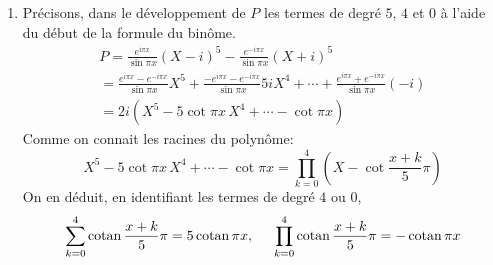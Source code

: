 \begin{enumerate}
\item  Pr\'{e}cisons, dans le d\'{e}veloppement de $P$ les termes de degré $5$, $4$ et $0$ \`{a} l'aide du d\'{e}but de la formule du bin\^{o}me. 
\begin{multline*}
P =\frac{e^{i\pi x}}{\sin \pi x}(X-i)^{5}-\frac{e^{-i\pi x}}{\sin \pi x}(X+i)^{5} \\
  = \frac{e^{i\pi x}-e^{-i\pi x}}{\sin \pi x}X^{5}+\frac{-e^{i\pi x}-e^{-i\pi x}}{\sin \pi x}5iX^{4}+\cdots
 +\frac{e^{i\pi x}+e^{-i\pi x}}{\sin \pi x}(-i)\\
  = 2i\left( X^{5}-5\cot \pi x\,X^{4}+\cdots -\cot \pi x\right)
\end{multline*}
Comme on connait les racines du polynôme:
\begin{displaymath}
X^{5}-5\cot \pi x\,X^{4}+\cdots -\cot \pi x = \prod_{k=0}^{4}\left( X-\cot \frac{x+k}{5}\pi \right)  
\end{displaymath}
On en d\'{e}duit, en identifiant les termes de degré $4$ ou $0$,
\begin{displaymath}
\sum_{k=0}^{4}\cot \frac{x+k}{5}\pi = 5\cot \pi x,\hspace{0.5cm}
\prod_{k=0}^{4}\cot \frac{x+k}{5}\pi = -\cot \pi x
\end{displaymath}
\end{enumerate}

